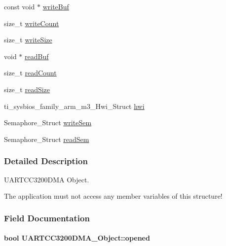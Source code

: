 \begin{DoxyCompactItemize}
const void $\ast$ \hyperlink{struct_u_a_r_t_c_c3200_d_m_a___object_a754751a2d40d2edc8a4458efbdbaa616}{write\-Buf}
\item 
size\-\_\-t \hyperlink{struct_u_a_r_t_c_c3200_d_m_a___object_a849f8aa9a98f26004d2740e7db45d7ad}{write\-Count}
\item 
size\-\_\-t \hyperlink{struct_u_a_r_t_c_c3200_d_m_a___object_a92b87bc61f1cbd23b357c5cc3811c298}{write\-Size}
\item 
void $\ast$ \hyperlink{struct_u_a_r_t_c_c3200_d_m_a___object_a634968517367872ef044a5a3fb5365bf}{read\-Buf}
\item 
size\-\_\-t \hyperlink{struct_u_a_r_t_c_c3200_d_m_a___object_a9af6975d5d858e76f403121f6e634fca}{read\-Count}
\item 
size\-\_\-t \hyperlink{struct_u_a_r_t_c_c3200_d_m_a___object_a77030d6b64ed16de385d3b804b3db99e}{read\-Size}
\item 
ti\-\_\-sysbios\-\_\-family\-\_\-arm\-\_\-m3\-\_\-\-Hwi\-\_\-\-Struct \hyperlink{struct_u_a_r_t_c_c3200_d_m_a___object_a6a8ccf6c1e0bd514f7610ec17cbdf0a8}{hwi}
\item 
Semaphore\-\_\-\-Struct \hyperlink{struct_u_a_r_t_c_c3200_d_m_a___object_affd1ce743433cdffdbbe0c0b9d8aca3b}{write\-Sem}
\item 
Semaphore\-\_\-\-Struct \hyperlink{struct_u_a_r_t_c_c3200_d_m_a___object_a7a64516d23436d142ad53025c69f9376}{read\-Sem}
\end{DoxyCompactItemize}


\subsubsection{Detailed Description}
U\-A\-R\-T\-C\-C3200\-D\-M\-A Object. 

The application must not access any member variables of this structure! 

\subsubsection{Field Documentation}
\paragraph[{opened}]{\setlength{\rightskip}{0pt plus 5cm}bool U\-A\-R\-T\-C\-C3200\-D\-M\-A\-\_\-\-Object\-::opened}\label{struct_u_a_r_t_c_c3200_d_m_a___object_ab51f5ef49aa00ef889bb8961e8eab614}
